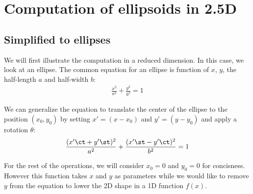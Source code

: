 \zzcommand{\ct}{\cos \theta}
\zzcommand{\cct}{\cos^2 \theta}
\zzcommand{\st}{\sin \theta}
\zzcommand{\sst}{\sin^2 \theta}

\zzcommand{\cp}{\cos \phi}
\zzcommand{\ccp}{\cos^2 \phi}
\zzcommand{\sp}{\sin \phi}
\zzcommand{\ssp}{\sin^2 \phi}


\chapter{Computation of ellipsoids in 2.5D}
\label{chap:computation-ellipsoid}


\section{Simplified to ellipses}

We will first illustrate the computation in a reduced dimension. In this case, we look at an ellipse.
The common equation for an ellipse is function of $x$, $y$, the half-length $a$ and half-width $b$:
\begin{align}
    \label{eq:ellipsoid_simplified-ellipse}
    \frac{x^2}{a^2} + \frac{y^2}{b^2} = 1
\end{align}

We can generalize the equation to translate the center of the ellipse to the position $(x_0, y_0)$ by setting $x'=(x-x_0)$ and $y'=(y-y_0)$ and apply a rotation $\theta$:
\begin{align}
    \label{eq:ellipsoid_general-ellipse}
    \frac{(x' \ct + y' \st)^2}{a^2} + \frac{(x' \st - y' \ct)^2}{b^2} = 1
\end{align}

For the rest of the operations, we will consider $x_0=0$ and $y_0=0$ for concisness.
However this function takes $x$ and $y$ as parameters while we would like to remove $y$ from the equation to lower the 2D shape in a 1D function $f(x)$.

